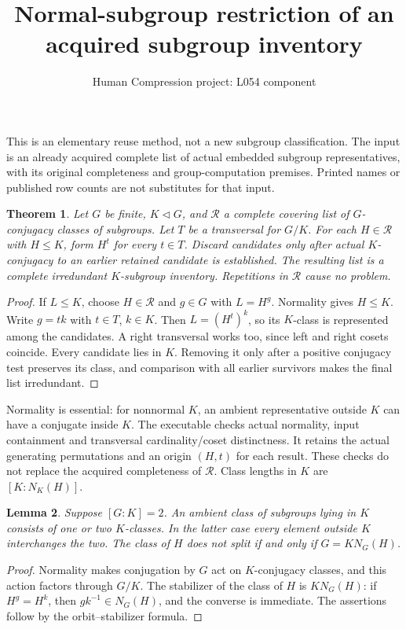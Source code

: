 \documentclass[11pt]{article}
\title{Normal-subgroup restriction of an acquired subgroup inventory}
\author{Human Compression project: L054 component}\date{}
\newtheorem{theorem}{Theorem}\newtheorem{lemma}[theorem]{Lemma}
\begin{document}
\maketitle
This is an elementary reuse method, not a new subgroup classification. The
input is an already acquired complete list of actual embedded subgroup
representatives, with its original completeness and group-computation premises.
Printed names or published row counts are not substitutes for that input.

\begin{theorem}
Let $G$ be finite, $K\lhd G$, and $\mathcal R$ a complete covering list of
$G$-conjugacy classes of subgroups. Let $T$ be a transversal for $G/K$.
For each $H\in\mathcal R$ with $H\le K$, form $H^t$ for every $t\in T$.
Discard candidates only after actual $K$-conjugacy to an earlier retained
candidate is established. The resulting list is a complete irredundant
$K$-subgroup inventory. Repetitions in $\mathcal R$ cause no problem.
\end{theorem}
\begin{proof}
If $L\le K$, choose $H\in\mathcal R$ and $g\in G$ with $L=H^g$.
Normality gives $H\le K$. Write $g=tk$ with $t\in T$, $k\in K$.
Then $L=(H^t)^k$, so its $K$-class is represented among the candidates.
A right transversal works too, since left and right cosets coincide.
Every candidate lies in $K$. Removing it only after a positive conjugacy
test preserves its class, and comparison with all earlier survivors makes
the final list irredundant.
\end{proof}

Normality is essential: for nonnormal $K$, an ambient representative outside
$K$ can have a conjugate inside $K$. The executable checks actual normality,
input containment and transversal cardinality/coset distinctness. It retains
the actual generating permutations and an origin $(H,t)$ for each result.
These checks do not replace the acquired completeness of $\mathcal R$.
Class lengths in $K$ are $[K:N_K(H)]$.

\begin{lemma}
Suppose $[G:K]=2$. An ambient class of subgroups lying in $K$ consists of one
or two $K$-classes. In the latter case every element outside $K$ interchanges
the two. The class of $H$ does not split if and only if $G=K N_G(H)$.
\end{lemma}
\begin{proof}
Normality makes conjugation by $G$ act on $K$-conjugacy classes, and this
action factors through $G/K$. The stabilizer of the class of $H$ is
$K N_G(H)$: if $H^g=H^k$, then $gk^{-1}\in N_G(H)$, and the converse
is immediate. The assertions follow by the orbit--stabilizer formula.
\end{proof}
\end{document}
